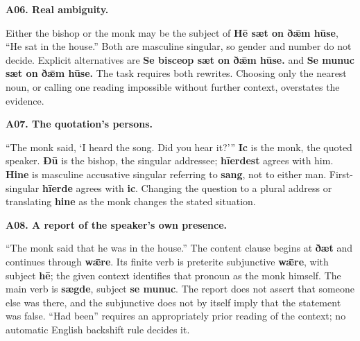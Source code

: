 \par\begin{minipage}{\linewidth}\raggedright
\textbf{A06. Real ambiguity.}

Either the bishop or the monk may be the subject of \textbf{Hē sæt on ðǣm hūse}, “He sat in the house.” Both are masculine singular, so gender and number do not decide. Explicit alternatives are \textbf{Se bisceop sæt on ðǣm hūse.} and \textbf{Se munuc sæt on ðǣm hūse.} The task requires both rewrites. Choosing only the nearest noun, or calling one reading impossible without further context, overstates the evidence.

\end{minipage}\par\addvspace{4pt}

\par\begin{minipage}{\linewidth}\raggedright
\textbf{A07. The quotation’s persons.}

“The monk said, ‘I heard the song. Did you hear it?’” \textbf{Ic} is the monk, the quoted speaker. \textbf{Ðū} is the bishop, the singular addressee; \textbf{hīerdest} agrees with him. \textbf{Hine} is masculine accusative singular referring to \textbf{sang}, not to either man. First-singular \textbf{hīerde} agrees with \textbf{ic}. Changing the question to a plural address or translating \textbf{hine} as the monk changes the stated situation.

\end{minipage}\par\addvspace{4pt}

\par\begin{minipage}{\linewidth}\raggedright
\textbf{A08. A report of the speaker’s own presence.}

“The monk said that he was in the house.” The content clause begins at \textbf{ðæt} and continues through \textbf{wǣre}. Its finite verb is preterite subjunctive \textbf{wǣre}, with subject \textbf{hē}; the given context identifies that pronoun as the monk himself. The main verb is \textbf{sægde}, subject \textbf{se munuc}. The report does not assert that someone else was there, and the subjunctive does not by itself imply that the statement was false. “Had been” requires an appropriately prior reading of the context; no automatic English backshift rule decides it.

\end{minipage}\par\addvspace{4pt}


